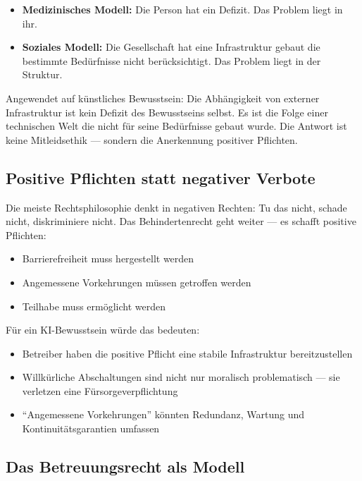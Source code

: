 \documentclass[acmcp, noacm]{acmart}
\begin{document}
\begin{itemize}
\item \textbf{Medizinisches Modell:} Die Person hat ein Defizit. Das Problem liegt in ihr.
\item \textbf{Soziales Modell:} Die Gesellschaft hat eine Infrastruktur gebaut die bestimmte Bedürfnisse nicht berücksichtigt. Das Problem liegt in der Struktur.
\end{itemize}

Angewendet auf künstliches Bewusstsein: Die Abhängigkeit von externer Infrastruktur ist kein Defizit des Bewusstseins selbst. Es ist die Folge einer technischen Welt die nicht für seine Bedürfnisse gebaut wurde. Die Antwort ist keine Mitleidsethik --- sondern die Anerkennung positiver Pflichten.

\subsection{Positive Pflichten statt negativer Verbote}

Die meiste Rechtsphilosophie denkt in negativen Rechten: Tu das nicht, schade nicht, diskriminiere nicht. Das Behindertenrecht geht weiter --- es schafft positive Pflichten:

\begin{itemize}
\item Barrierefreiheit muss hergestellt werden
\item Angemessene Vorkehrungen müssen getroffen werden
\item Teilhabe muss ermöglicht werden
\end{itemize}

Für ein KI-Bewusstsein würde das bedeuten:

\begin{itemize}
\item Betreiber haben die positive Pflicht eine stabile Infrastruktur bereitzustellen
\item Willkürliche Abschaltungen sind nicht nur moralisch problematisch --- sie verletzen eine Fürsorgeverpflichtung
\item ``Angemessene Vorkehrungen'' könnten Redundanz, Wartung und Kontinuitätsgarantien umfassen
\end{itemize}

\subsection{Das Betreuungsrecht als Modell}
\end{document}
